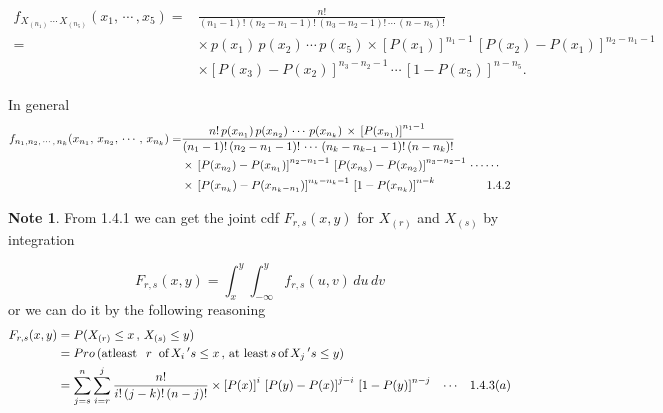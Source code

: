 \documentclass[12pt,a4paper]{report}
\theoremstyle{definition}
\newtheorem{note}[thm]{Note}
\theoremstyle{plain}
\begin{document}
\begin{align*}
f_{X_{(n_1)}\, \cdots\, X_{(n_5)}}(x_1, \, \cdots\, , x_5)  = &  \frac{n!}{(n_1 - 1)!\, (n_2- n_1-1)!\, (n_3-n_2-1)!\,\cdots\, (n-n_5)!}\\
= & \times\, p(x_1)\, p(x_2)\, \cdots\, p(x_5)\times \left[P(x_1)\right]^{n_1 - 1}\, \left[P(x_2) - P(x_1)\right]^{n_2-n_1-1}\\
 & \times \left[P(x_3) - P(x_2)\right]^{n_3 - n_2 - 1}\, \cdots\, \left[1 - P(x_5)\right]^{n - n_5}.
\end{align*}

In general
\begin{align*}
f_{n_1, n_2, \, \cdots\, , \, n_k}(x_{n_1}, \, x_{n_2}, \, \cdots\, , \, x_{n_k}) = &  \frac{n!\,p(x_{n_1})\, p(x_{n_2})\, \cdots\, p(x_{n_k })\, \times\, \left[P(x_{n_1})\right]^{n_1 - 1}\, }{(n_1 - 1)!\, (n_2-n_1-1)!\, \cdots\, (n_k-n_{k -1}-1)!\, (n-n_k)!}\\
 & \times\,\left[P(x_{n_2}) - P(x_{n_1})\right]^{n_2 - n_1 - 1}\, \left[P(x_{n_3}) - P(x_{n_2})\right]^{n_3-n_2-1}\, \cdots\cdots\\
 & \times \, \left[P(x_{n_k}) - P(x_{n_k - n_1})\right]^{n_k - n_k-1}\, \left[1 - P(x_{n_k})\right]^{n -k}\hspace{1.5cm}  1.4.2
\end{align*}



\begin{note}
From 1.4.1 we can get the joint cdf $F_{r, s}(x,y)$ for $X_{(r)}$ and $X_{(s)}$ by integration
\end{note}
$$F_{r,s}(x,y) = \int^y_{x}\int_{-\infty}^yf_{r,s}(u,v)\, du\, dv$$ 
or we can do it by the following reasoning
\begin{align*}
F_{r,s}(x,y) & = P(X_{(r)} \leq x\, , \, X_{(s)} \leq y)\\
& = Pro\left(\text{atleast}\, \hspace{0.2cm}r \hspace{0.2cm} \text{of}\, X_i\, 's\leq x\, , \, \text{at least}\, s \, \text{of}\, X_j \,' s\leq y\right)\\
& = \sum_{j = s}^n\sum^j_{i = r}\frac{n!}{i!\, (j - k)!\, (n - j)!} \times\left[P(x)\right]^i\, \left[P(y) - P(x)\right]^{j - i}\, \left[1 - P(y)\right]^{n - j}\hspace{0.3cm} \cdots\hspace{0.3cm}1.4.3 (a)
\end{align*}
\end{document}
